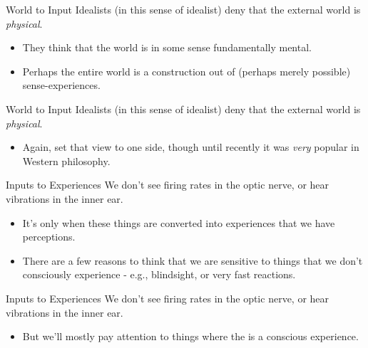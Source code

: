 \documentclass[
  17pt,
  letterpaper,
  ignorenonframetext,
  aspectratio=169,
  xcolor={dvipsnames}]{beamer}
\providecommand{\tightlist}{%
  \setlength{\itemsep}{0pt}\setlength{\parskip}{0pt}}\usepackage{longtable,booktabs,array}
\begin{document}
\begin{frame}{World to Input}
\protect\hypertarget{world-to-input}{}
Idealists (in this sense of idealist) deny that the external world is
\emph{physical}.

\begin{itemize}[<+->]
\tightlist
\item
  They think that the world is in some sense fundamentally mental.
\item
  Perhaps the entire world is a construction out of (perhaps merely
  possible) sense-experiences.
\end{itemize}
\end{frame}

\begin{frame}{World to Input}
\protect\hypertarget{world-to-input-1}{}
Idealists (in this sense of idealist) deny that the external world is
\emph{physical}.

\begin{itemize}[<+->]
\tightlist
\item
  Again, set that view to one side, though until recently it was
  \emph{very} popular in Western philosophy.
\end{itemize}
\end{frame}

\begin{frame}{Inputs to Experiences}
\protect\hypertarget{inputs-to-experiences}{}
We don't see firing rates in the optic nerve, or hear vibrations in the
inner ear.

\begin{itemize}[<+->]
\tightlist
\item
  It's only when these things are converted into experiences that we
  have perceptions.
\item
  There are a few reasons to think that we are sensitive to things that
  we don't consciously experience - e.g., blindsight, or very fast
  reactions.
\end{itemize}
\end{frame}

\begin{frame}{Inputs to Experiences}
\protect\hypertarget{inputs-to-experiences-1}{}
We don't see firing rates in the optic nerve, or hear vibrations in the
inner ear.

\begin{itemize}[<+->]
\tightlist
\item
  But we'll mostly pay attention to things where the is a conscious
  experience.
\end{itemize}
\end{frame}
\end{document}

